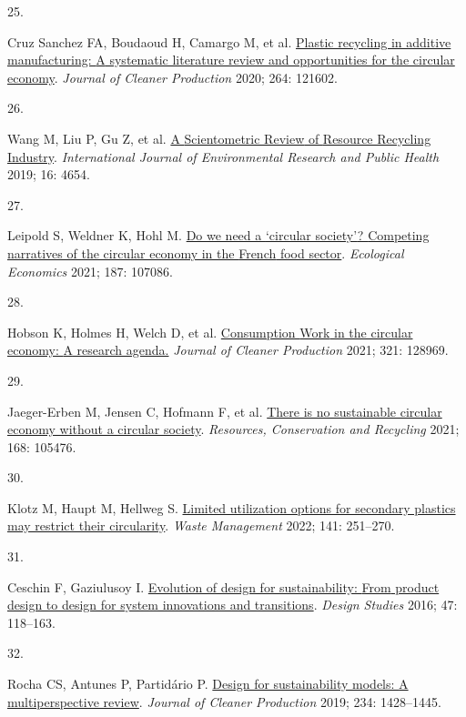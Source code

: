 \documentclass[
  11pt,
  a4paperpaper,
  onecolumn]{article}
\newlength{\cslhangindent}
\newlength{\csllabelwidth}
\newlength{\cslentryspacingunit} %
\newenvironment{CSLReferences}[2] %
 {%
  \setlength{\parindent}{0pt}
  \ifodd #1
  \let\oldpar\par
  \def\par{\hangindent=\cslhangindent\oldpar}
  \fi
  \setlength{\parskip}{#2\cslentryspacingunit}
 }%
 {}
\newcommand{\CSLLeftMargin}[1]{\parbox[t]{\csllabelwidth}{#1}}
\newcommand{\CSLRightInline}[1]{\parbox[t]{\linewidth - \csllabelwidth}{#1}\break}
\begin{document}
\begin{CSLReferences}{0}{0}
\leavevmode{}%
\CSLLeftMargin{25. }%
\CSLRightInline{Cruz Sanchez FA, Boudaoud H, Camargo M, et al.
\href{https://doi.org/10.1016/j.jclepro.2020.121602}{Plastic recycling
in additive manufacturing: {A} systematic literature review and
opportunities for the circular economy}. \emph{Journal of Cleaner
Production} 2020; 264: 121602.}

\leavevmode{}%
\CSLLeftMargin{26. }%
\CSLRightInline{Wang M, Liu P, Gu Z, et al.
\href{https://doi.org/10.3390/ijerph16234654}{A {Scientometric Review}
of {Resource Recycling Industry}}. \emph{International Journal of
Environmental Research and Public Health} 2019; 16: 4654.}

\leavevmode{}%
\CSLLeftMargin{27. }%
\CSLRightInline{Leipold S, Weldner K, Hohl M.
\href{https://doi.org/10.1016/j.ecolecon.2021.107086}{Do we need a
{`circular society'}? {Competing} narratives of the circular economy in
the {French} food sector}. \emph{Ecological Economics} 2021; 187:
107086.}

\leavevmode{}%
\CSLLeftMargin{28. }%
\CSLRightInline{Hobson K, Holmes H, Welch D, et al.
\href{https://doi.org/10.1016/J.JCLEPRO.2021.128969}{Consumption {Work}
in the circular economy: {A} research agenda.} \emph{Journal of Cleaner
Production} 2021; 321: 128969.}

\leavevmode{}%
\CSLLeftMargin{29. }%
\CSLRightInline{Jaeger-Erben M, Jensen C, Hofmann F, et al.
\href{https://doi.org/10.1016/j.resconrec.2021.105476}{There is no
sustainable circular economy without a circular society}.
\emph{Resources, Conservation and Recycling} 2021; 168: 105476.}

\leavevmode{}%
\CSLLeftMargin{30. }%
\CSLRightInline{Klotz M, Haupt M, Hellweg S.
\href{https://doi.org/10.1016/J.WASMAN.2022.01.002}{Limited utilization
options for secondary plastics may restrict their circularity}.
\emph{Waste Management} 2022; 141: 251--270.}

\leavevmode{}%
\CSLLeftMargin{31. }%
\CSLRightInline{Ceschin F, Gaziulusoy I.
\href{https://doi.org/10.1016/j.destud.2016.09.002}{Evolution of design
for sustainability: {From} product design to design for system
innovations and transitions}. \emph{Design Studies} 2016; 47: 118--163.}

\leavevmode{}%
\CSLLeftMargin{32. }%
\CSLRightInline{Rocha CS, Antunes P, Partidário P.
\href{https://doi.org/10.1016/j.jclepro.2019.06.108}{Design for
sustainability models: {A} multiperspective review}. \emph{Journal of
Cleaner Production} 2019; 234: 1428--1445.}

\end{CSLReferences}
\end{document}
